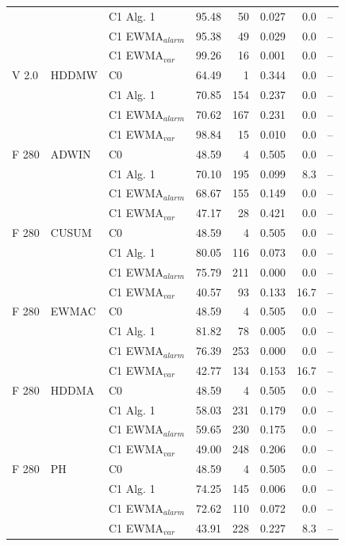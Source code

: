 \begin{longtable}{lllrrrrr}
 &  & C1 Alg. 1 & 95.48 & 50 & 0.027 & 0.0 & -- \\
 &  & C1 EWMA$_{alarm}$ & 95.38 & 49 & 0.029 & 0.0 & -- \\
 &  & C1 EWMA$_{var}$ & 99.26 & 16 & 0.001 & 0.0 & -- \\
\hline
V  2.0 & HDDMW & C0 & 64.49 & 1 & 0.344 & 0.0 & -- \\
 &  & C1 Alg. 1 & 70.85 & 154 & 0.237 & 0.0 & -- \\
 &  & C1 EWMA$_{alarm}$ & 70.62 & 167 & 0.231 & 0.0 & -- \\
 &  & C1 EWMA$_{var}$ & 98.84 & 15 & 0.010 & 0.0 & -- \\
\hline
F  280 & ADWIN & C0 & 48.59 & 4 & 0.505 & 0.0 & -- \\
 &  & C1 Alg. 1 & 70.10 & 195 & 0.099 & 8.3 & -- \\
 &  & C1 EWMA$_{alarm}$ & 68.67 & 155 & 0.149 & 0.0 & -- \\
 &  & C1 EWMA$_{var}$ & 47.17 & 28 & 0.421 & 0.0 & -- \\
\hline
F  280 & CUSUM & C0 & 48.59 & 4 & 0.505 & 0.0 & -- \\
 &  & C1 Alg. 1 & 80.05 & 116 & 0.073 & 0.0 & -- \\
 &  & C1 EWMA$_{alarm}$ & 75.79 & 211 & 0.000 & 0.0 & -- \\
 &  & C1 EWMA$_{var}$ & 40.57 & 93 & 0.133 & 16.7 & -- \\
\hline
F  280 & EWMAC & C0 & 48.59 & 4 & 0.505 & 0.0 & -- \\
 &  & C1 Alg. 1 & 81.82 & 78 & 0.005 & 0.0 & -- \\
 &  & C1 EWMA$_{alarm}$ & 76.39 & 253 & 0.000 & 0.0 & -- \\
 &  & C1 EWMA$_{var}$ & 42.77 & 134 & 0.153 & 16.7 & -- \\
\hline
F  280 & HDDMA & C0 & 48.59 & 4 & 0.505 & 0.0 & -- \\
 &  & C1 Alg. 1 & 58.03 & 231 & 0.179 & 0.0 & -- \\
 &  & C1 EWMA$_{alarm}$ & 59.65 & 230 & 0.175 & 0.0 & -- \\
 &  & C1 EWMA$_{var}$ & 49.00 & 248 & 0.206 & 0.0 & -- \\
\hline
F  280 & PH & C0 & 48.59 & 4 & 0.505 & 0.0 & -- \\
 &  & C1 Alg. 1 & 74.25 & 145 & 0.006 & 0.0 & -- \\
 &  & C1 EWMA$_{alarm}$ & 72.62 & 110 & 0.072 & 0.0 & -- \\
 &  & C1 EWMA$_{var}$ & 43.91 & 228 & 0.227 & 8.3 & -- \\

\end{longtable}
